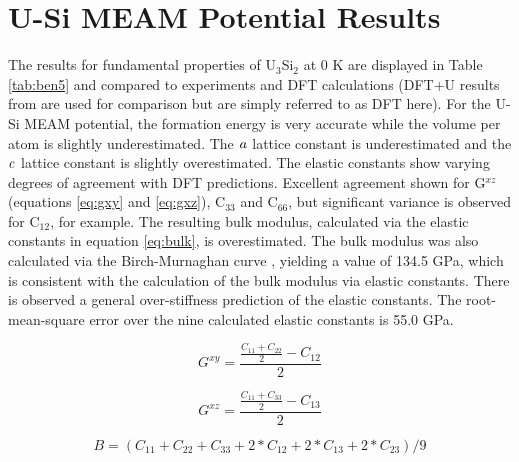 \documentclass[review]{elsarticle}
\begin{document}
\clearpage

\section{U-Si MEAM Potential Results}

The results for fundamental properties of U$_{3}$Si$_{2}$ at 0 K are displayed in Table \ref{tab:ben5} and compared to experiments \cite{zachariasen1949, berche2009} and DFT calculations \cite{noordhoek2016} (DFT+U results from \cite{noordhoek2016} are used for comparison but are simply referred to as DFT here).  For the U-Si MEAM potential, the formation energy is very accurate while the volume per atom is slightly underestimated.  The $\it{a}$ lattice constant is underestimated and the $\it{c}$ lattice constant is slightly overestimated.  The elastic constants show varying degrees of agreement with DFT predictions.  Excellent agreement shown for G$^{xz}$ (equations \ref{eq:gxy} and \ref{eq:gxz}), C$_{33}$ and C$_{66}$, but significant variance is observed for C$_{12}$, for example.  The resulting bulk modulus, calculated via the elastic constants in equation \ref{eq:bulk}, is overestimated.  The bulk modulus was also calculated via the Birch-Murnaghan curve \cite{cohen85, birch47}, yielding a value of 134.5 GPa, which is consistent with the calculation of the bulk modulus via elastic constants.  There is observed a general over-stiffness prediction of the elastic constants.  The root-mean-square error over the nine calculated elastic constants is 55.0 GPa.  

\begin{equation}
\label{eq:gxy}
G^{xy}= \frac{\frac{C_{11} + C_{22}}{2} - C_{12}}{2}
\end{equation}

\begin{equation}
\label{eq:gxz}
G^{xz}= \frac{\frac{C_{11} + C_{33}}{2} - C_{13}}{2}
\end{equation}

\begin{equation}
\label{eq:bulk}
B=(C_{11} + C_{22} + C_{33} + 2*C_{12} + 2*C_{13} + 2*C_{23})/9
\end{equation}
\end{document}
